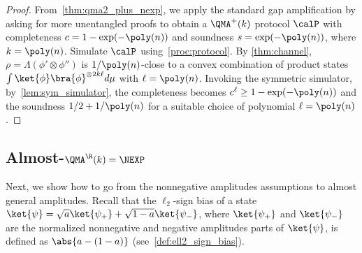 \TheoQMAThree*

\begin{proof}
  From~\cref{thm:qma2_plus_nexp}, we apply the standard gap amplification by asking for more unentangled proofs to obtain a $\QMA^+(k)$ protocol $\calP$ with completeness $c = 1-\exp(-\poly(n))$
  and soundness $s=\exp(-\poly(n))$, where $k=\poly(n)$. Simulate $\calP$ using~\cref{proc:protocol}.
  By \cref{thm:channel}, $\rho = \Lambda(\phi'\otimes \phi'')$ is $1/\poly(n)$-close to a convex combination of
  product states $\int \ket{\phi} \bra{\phi}^{\otimes 2k\ell} d\mu$ with $\ell = \poly(n)$. Invoking the symmetric simulator, by~\cref{lem:sym_simulator},
  the completeness becomes $c^\ell \ge 1-\exp(-\poly(n))$ and the soundness $1/2+1/\poly(n)$ for a suitable choice of polynomial $\ell=\poly(n)$.
\end{proof}



\subsection{Almost-$\QMA^\R(k) = \NEXP$}
Next, we show how to go from the nonnegative amplitudes assumptions to almost general amplitudes.
Recall that the $\ell_2$-sign bias of a state $\ket{\psi} = \sqrt{a} \ket{\psi_+} + \sqrt{1-a}\ket{\psi_{-}}$,
where $\ket{\psi_+}$ and $\ket{\psi_{-}}$ are the normalized nonnegative and negative amplitudes parts of $\ket{\psi}$,
is defined as $\abs{a-(1-a)}$ (see~\cref{def:ell2_sign_bias}). 

\TheoAlmostGenAmp*

